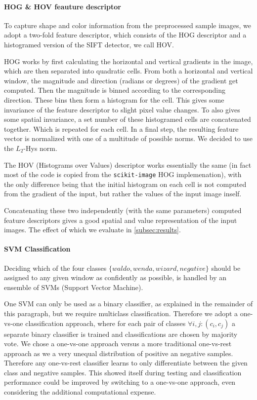 \documentclass[11pt]{article}
\begin{document}
\paragraph{HOG \& HOV feauture descriptor}
To capture shape and color information from the preprocessed sample images, we adopt a two-fold feature descriptor, 
which consists of the HOG descriptor and a histogramed version of the SIFT detector, we call HOV.

HOG works by first calculating the horizontal and vertical gradients in the image, which are then separated into
quadratic cells. From both a horizontal and vertical window, the magnitude and direction (radians or degrees) of the gradient get computed.
Then the magnitude is binned according to the corresponding direction. These bins then form a histogram for the cell.
This gives some invariance of the feature descriptor to slight pixel value changes. 
To also gives some spatial invariance, a set number of these histogramed cells are concatenated together. Which is repeated for each cell.
In a final step, the resulting feature vector is normalized with one of a multitude of possible norms. We decided to use the \( L_2 \)-Hys norm.

The HOV (Histograms over Values) descriptor works essentially the same (in fact most of the code is copied from the \verb|scikit-image| HOG implemenation),
with the only difference being that the initial histogram on each cell is not computed from the gradient of the input,
but rather the values of the input image inself.

Concatenating these two independently (with the same parameters) computed feature descriptors gives a good spatial and
value representation of the input images. The effect of which we evaluate in \autoref{subsec:results}.


\paragraph{SVM Classification}
Deciding which of the four classes \( \{waldo, wenda, wizard, negative \} \) should be assigned to any given window 
as confidently as possible, is handled by an ensemble of SVMs (Support Vector Machine)\cite{Hearst:1998:SVM:630302.630387}.

One SVM can only be used as a binary classifier, as explained in the remainder of this paragraph, but we require multiclass classification. 
Therefore we adopt a one-vs-one classification approach, where for each pair of classes \( \forall i,j: (c_i,c_j) \) a separate binary classifier is trained
and classifications are chosen by majority vote. We chose a one-vs-one approach versus a more traditional one-vs-rest approach as we a very unequal distribution of
positive an negative samples. Therefore any one-vs-rest classifier learns to only differentiate between the given class and negative samples. This showed itself 
during testing and classification performance could be improved by switching to a one-vs-one approach, even considering the additional computational expense.
\end{document}
